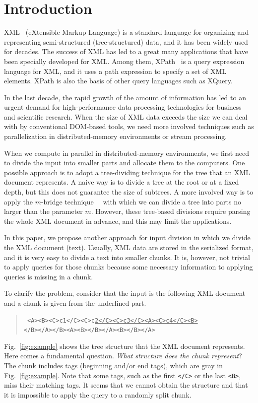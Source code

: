 \section{Introduction}

XML~\cite{XML} (eXtensible Markup Language) is a standard language for organizing
and representing semi-structured (tree-structured) data, and it has been
widely used for decades.
The success of XML has led to a great many applications that have been
specially developed for XML. Among them, XPath~\cite{XPath} is a query expression language for XML,
and it uses a path expression to specify a set of XML elements.
XPath is also the basis of other query languages such as XQuery.

In the last decade, the rapid growth of the amount of information has led to
an urgent demand for high-performance data processing technologies for
business and scientific research.  
When the size of XML data exceeds the size we can deal with 
by conventional DOM-based tools, we need more involved techniques
such as parallelization in distributed-memory environments or stream processing.

When we compute in parallel in distributed-memory environments, we first
need to divide the input into smaller parts and allocate them to the
computers.  One possible approach is to adopt a tree-dividing technique
for the tree that an XML document represents.  A naive way is to divide
a tree at the root or at a fixed depth, but this does not guarantee the
size of subtrees.  A more involved way is to apply the $m$-bridge
technique~\cite{mbridges}~\cite{mbridges1} with which we can divide a tree into parts no
larger than the parameter $m$.  However, these tree-based divisions
require parsing the whole XML document in advance, and this may limit the applications.

In this paper, we propose another approach for input division in which
we divide the XML document (text).  Usually, XML data are stored in the serialized format,
and it is very easy to divide a text into smaller chunks.
It is, however, not trivial to apply queries for those chunks because
some necessary information to applying queries is missing in a chunk.

To clarify the problem, consider that the input is the following XML document
and a chunk is given from the underlined part.
\begin{quote}\small\tt
\smallskip
<A><B><C>c1</C><C>c\underline{2</C><C>c3</C><A><C>c4</C><B>}\\
</B></A></B><A><B></B></A><B></B></A>
\smallskip
\end{quote}
Fig.~\ref{fig:example} shows the tree structure that the XML document represents.
Here comes a fundamental question.  \emph{What structure does
the chunk represent\/}? The chunk includes tags (beginning
and/or end tags), which are gray in Fig.~\ref{fig:example}. Note
that some tags, such as the first \verb|</C>| or the last \verb|<B>|,
miss their matching tags. It seems that we cannot obtain the structure and that it is impossible 
to apply the query to a randomly split chunk.

